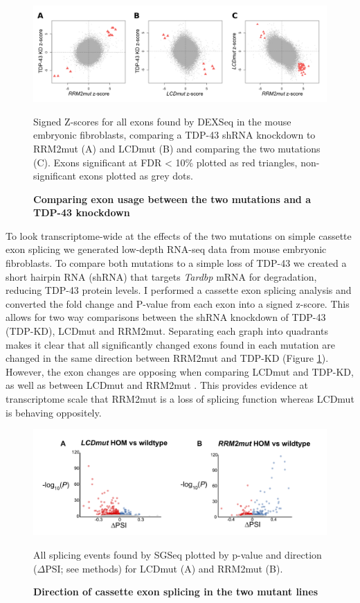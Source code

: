 \begin{figure}[h]
	\centering
	\includegraphics[width=\textwidth]{Figures/05_tdp_mice/mef_scatters.png}
	\caption{\textbf{Comparing exon usage between the two mutations and a TDP-43 knockdown}}
	Signed Z-scores for all exons found by DEXSeq in the mouse embryonic fibroblasts, comparing a TDP-43 shRNA knockdown to RRM2mut (A) and LCDmut (B) and comparing the two mutations (C). Exons significant at FDR < 10\% plotted as red triangles, non-significant exons plotted as grey dots.
	\label{fig:mef_scatters}
\end{figure}

To look transcriptome-wide at the effects of the two mutations on simple cassette exon splicing we generated low-depth RNA-seq data from mouse embryonic fibroblasts. 
To compare both mutations to a simple loss of TDP-43 we created a short hairpin RNA (shRNA) that targets \textit{Tardbp} mRNA for degradation, reducing TDP-43 protein levels. 
I performed a cassette exon splicing analysis and converted the fold change and P-value from each exon into a signed z-score. 
This allows for two way comparisons  between the shRNA knockdown of TDP-43 (TDP-KD), LCDmut and RRM2mut. 
Separating each graph into quadrants makes it clear that all significantly changed exons found in each mutation are changed in the same direction between RRM2mut and TDP-KD (Figure \ref{fig:mef_scatters}). 
However, the exon changes are opposing when comparing LCDmut and TDP-KD, as well as between LCDmut and RRM2mut . 
This provides evidence at transcriptome scale that RRM2mut is a loss of splicing function whereas LCDmut is behaving oppositely.

\begin{figure}[h]
	\centering
	\includegraphics[width=\textwidth]{Figures/05_tdp_mice/transcriptome_scatters.png}
	\caption{\textbf{Direction of cassette exon splicing in the two mutant lines}}
	All splicing events found by SGSeq plotted by p-value and direction ($\Delta$PSI; see methods) for LCDmut (A) and RRM2mut (B).
	\label{fig:cassette_scatters}
\end{figure}

